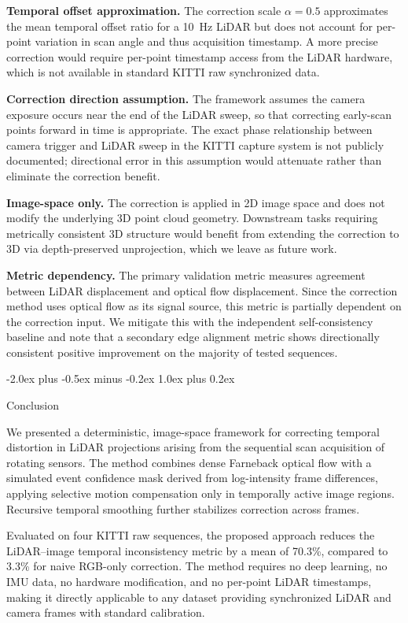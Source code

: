 \documentclass[conference]{IEEEtran}
\makeatletter
\def\section{\@startsection{section}{1}{\z@}
  {-2.0ex plus -0.5ex minus -0.2ex}
  {1.0ex plus 0.2ex}
  {\normalfont\large\bfseries\raggedright}}
\makeatother
\begin{document}
\textbf{Temporal offset approximation.} The correction scale
$\alpha = 0.5$ approximates the mean temporal offset ratio for a
10~Hz LiDAR but does not account for per-point variation in scan
angle and thus acquisition timestamp. A more precise correction
would require per-point timestamp access from the LiDAR hardware,
which is not available in standard KITTI raw synchronized data.

\textbf{Correction direction assumption.} The framework assumes the
camera exposure occurs near the end of the LiDAR sweep, so that
correcting early-scan points forward in time is appropriate. The
exact phase relationship between camera trigger and LiDAR sweep in
the KITTI capture system is not publicly documented; directional
error in this assumption would attenuate rather than eliminate the
correction benefit.

\textbf{Image-space only.} The correction is applied in 2D image
space and does not modify the underlying 3D point cloud geometry.
Downstream tasks requiring metrically consistent 3D structure would
benefit from extending the correction to 3D via depth-preserved
unprojection, which we leave as future work.

\textbf{Metric dependency.} The primary validation metric measures
agreement between LiDAR displacement and optical flow displacement.
Since the correction method uses optical flow as its signal source,
this metric is partially dependent on the correction input. We
mitigate this with the independent self-consistency baseline and
note that a secondary edge alignment metric shows directionally
consistent positive improvement on the majority of tested sequences.

\section{Conclusion}

We presented a deterministic, image-space framework for correcting
temporal distortion in LiDAR projections arising from the sequential
scan acquisition of rotating sensors. The method combines dense
Farneback optical flow with a simulated event confidence mask derived
from log-intensity frame differences, applying selective motion
compensation only in temporally active image regions. Recursive
temporal smoothing further stabilizes correction across frames.

Evaluated on four KITTI raw sequences, the proposed approach reduces
the LiDAR--image temporal inconsistency metric by a mean of 70.3\%,
compared to 3.3\% for naive RGB-only correction. The method requires
no deep learning, no IMU data, no hardware modification, and no
per-point LiDAR timestamps, making it directly applicable to any
dataset providing synchronized LiDAR and camera frames with standard
calibration.
\end{document}
